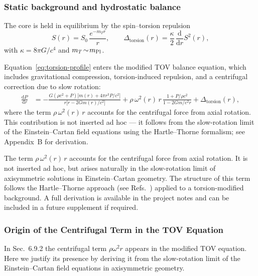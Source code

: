 \documentclass{article}
\begin{document}
\subsubsection{Static background and hydrostatic balance}

The core is held in equilibrium by the spin–torsion repulsion  
\begin{equation}
  S(r)=S_{0}\,\frac{e^{-m_{T}r}}{r},\qquad
  \Delta_{\text{torsion}}(r)=\frac{\kappa}{2}\,
  \frac{\mathrm d}{\mathrm dr}S^{2}(r),
  \label{eq:torsion-profile}
\end{equation}
with $\kappa=8\pi G/c^{4}$ and $m_{T}\!\sim\!m_{\rm Pl}$.  

Equation~\eqref{eq:torsion-profile} enters the modified TOV balance equation, which includes gravitational compression, torsion-induced repulsion, and a centrifugal correction due to slow rotation:
\begin{align}
\frac{\mathrm dP}{\mathrm dr} &=
-\frac{G(\rho c^{2}+P)\bigl[m(r)+4\pi r^{3}P/c^{2}\bigr]}
       {r\bigl[r-2Gm(r)/c^{2}\bigr]}
+\rho\,\omega^{2}(r)\,r\,
\frac{1+P/\rho c^{2}}{1-2Gm/c^{2}r}
+\Delta_{\text{torsion}}(r),
\end{align}
where the term \( \rho\,\omega^{2}(r)\,r \) accounts for the centrifugal force from axial rotation. This contribution is not inserted ad hoc — it follows from the slow-rotation limit of the Einstein–Cartan field equations using the Hartle–Thorne formalism; see Appendix~B for derivation.


The term \( \rho\,\omega^{2}(r)\,r \) accounts for the centrifugal force from axial rotation. It is not inserted ad hoc, but arises naturally in the slow-rotation limit of axisymmetric solutions in Einstein–Cartan geometry. The structure of this term follows the Hartle–Thorne approach (see Refs.~\cite{Hartle1967, Thorne1968}) applied to a torsion-modified background. A full derivation is available in the project notes and can be included in a future supplement if required.



\subsubsection{Origin of the Centrifugal Term in the TOV Equation}

In Sec.~6.9.2 the centrifugal term \( \rho \omega^2 r \) appears in the modified TOV equation. Here we justify its presence by deriving it from the slow-rotation limit of the Einstein–Cartan field equations in axisymmetric geometry.
\end{document}
